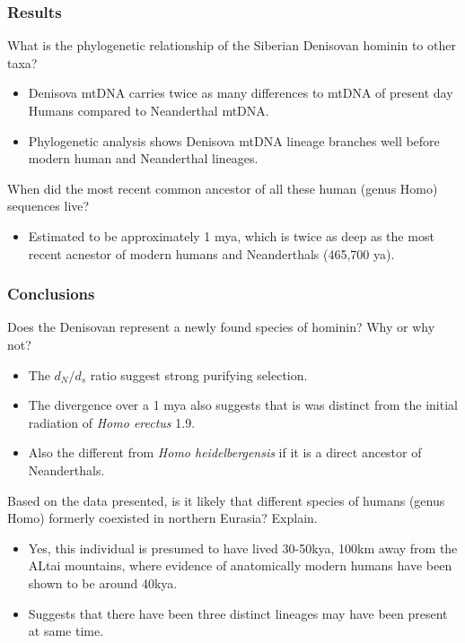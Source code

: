 \documentclass[12pt,a4paper]{article}
\begin{document}
\subsubsection{Results}
\begin{itemize}
   {\color{G-Moon}\item What is the phylogenetic relationship of the Siberian Denisovan hominin to other taxa?}
        \begin{itemize}
            \item Denisova mtDNA carries twice as many differences to mtDNA of present day Humans compared to Neanderthal mtDNA.
            \item Phylogenetic analysis shows Denisova mtDNA lineage branches well before modern human and Neanderthal lineages.
        \end{itemize}
   {\color{G-Moon}\item When did the most recent common ancestor of all these human (genus Homo) sequences live?}
        \begin{itemize}
            \item Estimated to be approximately 1 mya, which is twice as deep as the most recent acnestor of modern humans and Neanderthals (465,700 ya).
        \end{itemize}
\end{itemize}
\subsubsection{Conclusions}
\begin{itemize}
    {\color{G-Moon}\item Does the Denisovan represent a newly found species of hominin? Why or why not?}
        \begin{itemize}
            \item The \(d_N/d_s\) ratio suggest strong purifying selection.
            \item The divergence over a 1 mya also suggests that is was distinct from the initial radiation of \textit{Homo erectus} 1.9.
            \item Also the different from \textit{Homo heidelbergensis} if it is a direct ancestor of Neanderthals.
        \end{itemize}
    {\color{G-Moon}\item Based on the data presented, is it likely that different species of humans (genus Homo) formerly coexisted in northern Eurasia? Explain.}
        \begin{itemize}
            \item Yes, this individual is presumed to have lived 30-50kya, 100km away from the ALtai mountains, where evidence of anatomically modern humans have been shown to be around 40kya. 
            \item Suggests that there have been three distinct lineages may have been present at same time. 
        \end{itemize}
\end{itemize}
\end{document}
